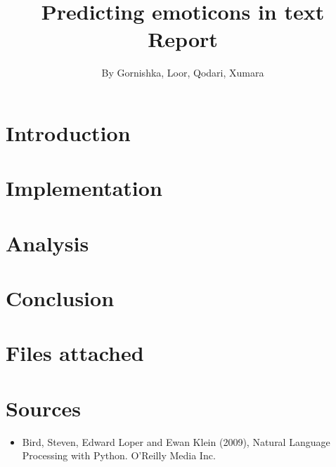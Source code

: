 \documentclass{article}
\begin{document}
\title{Predicting emoticons in text \\ Report}

\author{By Gornishka, Loor, Qodari, Xumara}
\maketitle

\tableofcontents

\pagebreak

\section*{Introduction}

\section*{Implementation}

\section*{Analysis}

\section*{Conclusion}

\section*{Files attached}

\section*{Sources}
\begin{itemize}
	\item Bird, Steven, Edward Loper and Ewan Klein (2009), Natural Language Processing with Python. O’Reilly Media Inc.
\end{itemize}
\end{document}
